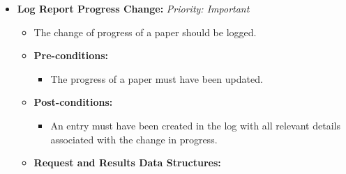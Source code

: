 \documentclass{article}
\begin{document}
\begin{itemize}
					\item \textbf{Log Report Progress Change:} \hfill \textit{Priority: Important}
					\begin{itemize}
						\item The change of progress of a paper should be logged.
						\item \textbf{Pre-conditions:}
						\begin{itemize}
							\item The progress of a paper must have been updated.
						\end{itemize}
						\item \textbf{Post-conditions:}
						\begin{itemize}
							\item An entry must have been created in the log with all relevant details associated with the change in progress.
						\end{itemize}
						\item \textbf{Request and Results Data Structures:}
					\end{itemize}					
					

\end{itemize}
\end{document}
